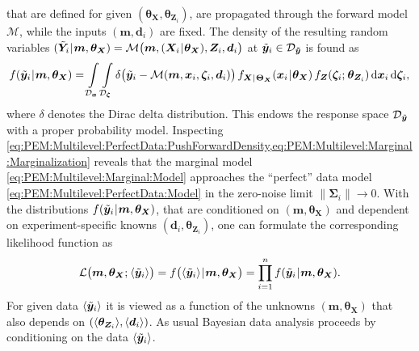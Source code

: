 that are defined for given \((\bm{\theta}_{\bm{X}},\bm{\theta}_{\bm{Z}_i})\), are propagated through the forward model \(\mathcal{M}\), while the inputs \((\bm{m},\bm{d}_i)\) are fixed.
The density of the resulting random variables \((\tilde{\bm{Y}}_i {\:\!}|{\:\!} \bm{m},\bm{\theta}_{\bm{X}}) = \mathcal{M} \big( \bm{m},(\bm{X}_i {\:\!}|{\:\!} \bm{\theta}_{\bm{X}}),\bm{Z}_i,\bm{d}_i \big)\)
at \(\tilde{\bm{y}}_i \in \mathcal{D}_{\bm{\tilde{y}}}\) is found as
\begin{equation} \label{eq:PEM:Multilevel:PerfectData:PushForwardDensity}
  f (\tilde{\bm{y}}_i {\:\!}|{\:\!} \bm{m},\bm{\theta}_{\bm{X}})
  = \int\limits_{\mathcal{D}_{\bm{x}}} \int\limits_{\mathcal{D}_{\bm{\zeta}}} \delta \big( \tilde{\bm{y}}_i - \mathcal{M}({\bm{m},\bm{x}_i,\bm{\zeta}_i,\bm{d}_i}) \big)
  \, f_{\bm{X} {\:\!}|{\:\!} \bm{\Theta}_{\bm{X}}} (\bm{x}_i {\:\!}|{\:\!} \bm{\theta}_{\bm{X}}) \, f_{\bm{Z}}(\bm{\zeta}_i ;{\:\!} \bm{\theta}_{\bm{Z}_i})
  \, \mathrm{d} \bm{x}_i \, \mathrm{d} \bm{\zeta}_i,
\end{equation}
where \(\delta\) denotes the Dirac delta distribution.
This endows the response space \(\mathcal{D}_{\tilde{\bm{y}}}\) with a proper probability model.
Inspecting \cref{eq:PEM:Multilevel:PerfectData:PushForwardDensity,eq:PEM:Multilevel:Marginal:Marginalization} reveals that the marginal model \cref{eq:PEM:Multilevel:Marginal:Model}
approaches the ``perfect'' data model \cref{eq:PEM:Multilevel:PerfectData:Model} in the zero-noise limit \(\lVert \bm{\Sigma}_i \rVert \rightarrow 0\).
With the distributions \(f (\tilde{\bm{y}}_i {\:\!}|{\:\!} \bm{m},\bm{\theta}_{\bm{X}})\), that are conditioned on \((\bm{m},\bm{\theta}_{\bm{X}})\) and dependent on experiment-specific knowns \((\bm{d}_i,\bm{\theta}_{\bm{Z}_i})\),
one can formulate the corresponding likelihood function as
\begin{equation} \label{eq:PEM:Multilevel:PerfectData:Likelihood}
  \mathcal{L} \big( \bm{m},\bm{\theta}_{\bm{X}} ;{\:\!} \langle{\tilde{\bm{y}}_i}\rangle \big)
  = f \big( \langle{\tilde{\bm{y}}_i}\rangle {\:\!}|{\:\!} \bm{m},\bm{\theta}_{\bm{X}} \big)
  = \prod\limits_{i=1}^n f (\tilde{\bm{y}}_i {\:\!}|{\:\!} \bm{m},\bm{\theta}_{\bm{X}}).
\end{equation}
For given data \(\langle{\tilde{\bm{y}}_i}\rangle\) it is viewed as a function of the unknowns \((\bm{m},\bm{\theta}_{\bm{X}})\) that also depends on \((\langle{\bm{\theta}_{\bm{Z}_i}}\rangle,\langle{\bm{d}_i}\rangle)\).
As usual Bayesian data analysis proceeds by conditioning on the data \(\langle{\tilde{\bm{y}}_i}\rangle\).
